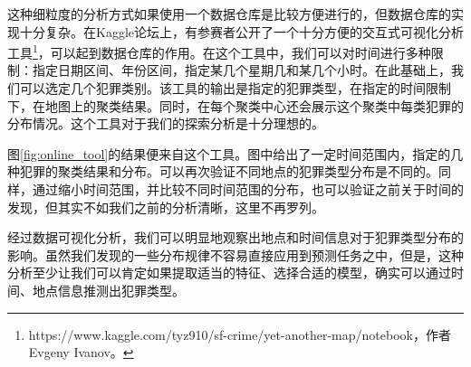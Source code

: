 这种细粒度的分析方式如果使用一个数据仓库是比较方便进行的，但数据仓库的实现十分复杂。在Kaggle论坛上，有参赛者公开了一个十分方便的交互式可视化分析工具\footnote{https://www.kaggle.com/tyz910/sf-crime/yet-another-map/notebook，作者Evgeny Ivanov。}，可以起到数据仓库的作用。在这个工具中，我们可以对时间进行多种限制：指定日期区间、年份区间，指定某几个星期几和某几个小时。在此基础上，我们可以选定几个犯罪类别。该工具的输出是指定的犯罪类型，在指定的时间限制下，在地图上的聚类结果。同时，在每个聚类中心还会展示这个聚类中每类犯罪的分布情况。这个工具对于我们的探索分析是十分理想的。

图\ref{fig:online_tool}的结果便来自这个工具。图中给出了一定时间范围内，指定的几种犯罪的聚类结果和分布。可以再次验证不同地点的犯罪类型分布是不同的。同样，通过缩小时间范围，并比较不同时间范围的分布，也可以验证之前关于时间的发现，但其实不如我们之前的分析清晰，这里不再罗列。

经过数据可视化分析，我们可以明显地观察出地点和时间信息对于犯罪类型分布的影响。虽然我们发现的一些分布规律不容易直接应用到预测任务之中，但是，这种分析至少让我们可以肯定如果提取适当的特征、选择合适的模型，确实可以通过时间、地点信息推测出犯罪类型。




